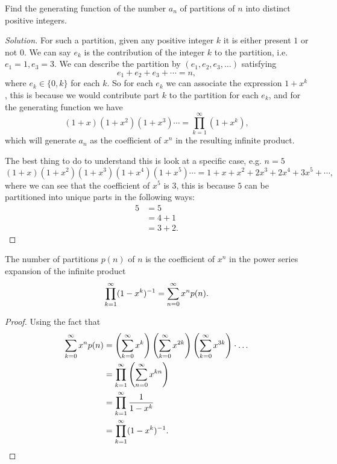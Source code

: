\documentclass[10pt, a4paper]{article}
\begin{document}
\begin{example}
    Find the generating function of the number $a_n$ of partitions of $n$ into distinct positive integers.
    \begin{proof}[Solution]\renewcommand{\qedsymbol}{}
        For such a partition,
        given any positive integer $k$ it is either present $1$ or not $0$.
        We can say $e_k$ is the contribution of the integer $k$ to the partition,
        i.e. $e_1 = 1, e_3 = 3$.
        We can describe the partition by $(e_1, e_2, e_3, \dotsc)$ satisfying
        \[
        e_1 + e_2 + e_3 + \dotsi = n,
        \]
        where $e_k \in \{0, k\}$ for each $k$.
        So for each $e_k$ we can associate the expression $1 + x ^ k$,
        this is because we would contribute part $k$ to the partition for each $e_k$,
        and for the generating function we have
        \[
        (1 + x)(1 + x ^ 2)(1 + x ^ 3) \dotsi = \prod_{k = 1}^{\infty}(1 + x ^ k),
        \]
        which will generate $a_n$ as the coefficient of $x ^ n$ in the resulting infinite product.

        The best thing to do to understand this is look at a specific case,
        e.g. $n = 5$
        \[
        (1 + x)(1 + x ^ 2)(1 + x ^ 3)(1 + x ^ 4)(1 + x ^ 5) \dotsi = 1 + x + x ^ 2 + 2x ^ 3 + 2x ^ 4 + 3x ^ 5 + \dotsi,
        \]
        where we can see that the coefficient of $x ^ 5$ is $3$,
        this is because $5$ can be partitioned into unique parts in the following ways: 
        \begin{align*}
            5 &= 5 \\
            &= 4 + 1 \\
            &= 3 + 2.
        \end{align*}
    \end{proof}
\end{example}

\begin{theorem}
    The number of partitions $p(n)$ of $n$ is the coefficient of $x ^ n$ in the power series expansion of the infinite product
    \[
    \prod_{k = 1}^{\infty}(1 - x ^ k)^{-1} = \infsum[n = 0] x ^ np(n).
    \]
    \begin{proof}
        Using the fact that
        \begin{align*}
            \infsum[k = 0]x ^ np(n) &= \left(\infsum[k = 0]x ^ k\right) \left(\infsum[k = 0]x ^ {2k}\right)\left(\infsum[k = 0]x ^ {3k}\right)\cdot\dotsc \\
            &= \prod_{k = 1}^{\infty}\left(\infsum[n = 0]x ^ {kn}\right) \\
            &= \prod_{k = 1}^{\infty}\frac{1}{1 - x ^ k} \\
            &= \prod_{k = 1}^{\infty}(1 - x ^ k) ^ {-1}.
        \end{align*}
        \[
        \]
    \end{proof}
\end{theorem}
\end{document}
